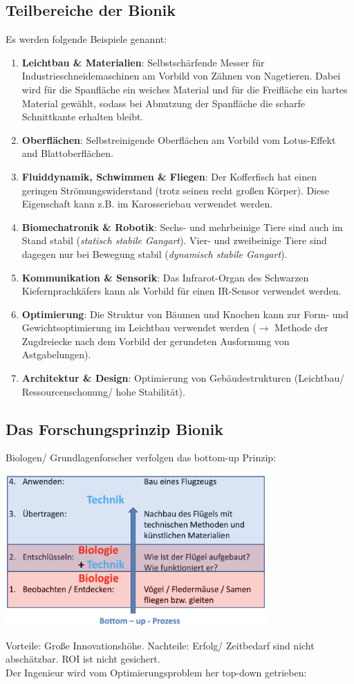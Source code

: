 \subsection{Teilbereiche der Bionik}
Es werden folgende Beispiele genannt:
\begin{enumerate}
	\item \textbf{Leichtbau \& Materialien}: Selbstschärfende Messer für Industrieschneidemaschinen am Vorbild von Zähnen von Nagetieren. Dabei wird für die Spanfläche ein weiches Material und für die Freifläche ein hartes Material gewählt, sodass bei Abnutzung der Spanfläche die scharfe Schnittkante erhalten bleibt.
	\item \textbf{Oberflächen}: Selbstreinigende Oberflächen am Vorbild vom Lotus-Effekt and Blattoberflächen.
	\item \textbf{Fluiddynamik, Schwimmen \& Fliegen}: Der Kofferfisch hat einen geringen Strömungswiderstand (trotz seinen recht großen Körper). Diese Eigenschaft kann z.B. im Karosseriebau verwendet werden.
	\item \textbf{Biomechatronik \& Robotik}: Sechs- und mehrbeinige Tiere sind auch im Stand stabil (\textit{statisch stabile Gangart}). Vier- und zweibeinige Tiere sind dagegen nur bei Bewegung stabil (\textit{dynamisch stabile Gangart}).
	\item \textbf{Kommunikation \& Sensorik}: Das Infrarot-Organ des Schwarzen Kiefernprachkäfers kann als Vorbild für einen IR-Sensor verwendet werden.
	\item \textbf{Optimierung}: Die Struktur von Bäumen und Knochen kann zur Form- und Gewichtsoptimierung im Leichtbau verwendet werden ($\rightarrow$ Methode der Zugdreiecke nach dem Vorbild der gerundeten Ausformung von Astgabelungen).
	\item \textbf{Architektur \& Design}: Optimierung von Gebäudestrukturen (Leichtbau/ Ressourcenschonung/ hohe Stabilität).
\end{enumerate}

\subsection{Das Forschungsprinzip Bionik}

Biologen/ Grundlagenforscher verfolgen das bottom-up Prinzip:
\begin{center}
	\includegraphics[width=10cm]{lec1/figures/Forschungsprinzip.png}	
\end{center}
Vorteile: Große Innovationshöhe. Nachteile: Erfolg/ Zeitbedarf sind nicht abschätzbar. ROI ist nicht gesichert.\\
Der Ingenieur wird vom Optimierungsproblem her top-down getrieben:


